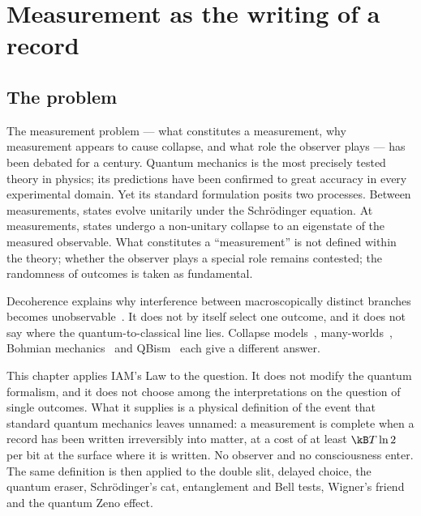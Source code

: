 \chapter{Measurement as the writing of a record}\label{ch:measurement}

\section{The problem}\label{sec:mp_problem}
The measurement problem --- what constitutes a measurement, why measurement appears to cause collapse, and what role the observer plays --- has been
debated for a century. Quantum mechanics is the most precisely tested theory in physics; its predictions have been confirmed to great accuracy in every
experimental domain. Yet its standard formulation posits two processes. Between measurements, states evolve unitarily under the Schr\"odinger equation.
At measurements, states undergo a non-unitary collapse to an eigenstate of the measured observable. What constitutes a ``measurement'' is not defined
within the theory; whether the observer plays a special role remains contested; the randomness of outcomes is taken as fundamental.

Decoherence explains why interference between macroscopically distinct branches becomes unobservable~\cite{Zurek2003,Schlosshauer2005,JoosZeh1985}. It
does not by itself select one outcome, and it does not say where the quantum-to-classical line lies. Collapse models~\cite{GRW1986,Bassi2013},
many-worlds~\cite{Everett1957}, Bohmian mechanics~\cite{Bohm1952} and QBism~\cite{Fuchs2014} each give a different answer.

This chapter applies IAM's Law to the question. It does not modify the quantum formalism, and it does not choose among the interpretations on the
question of single outcomes. What it supplies is a physical definition of the event that standard quantum mechanics leaves unnamed: a measurement is
complete when a record has been written irreversibly into matter, at a cost of at least $\kB T\ln2$ per bit at the surface where it is written. No
observer and no consciousness enter. \interp{} The same definition is then applied to the double slit, delayed choice, the quantum eraser, Schr\"odinger's
cat, entanglement and Bell tests, Wigner's friend and the quantum Zeno effect.

